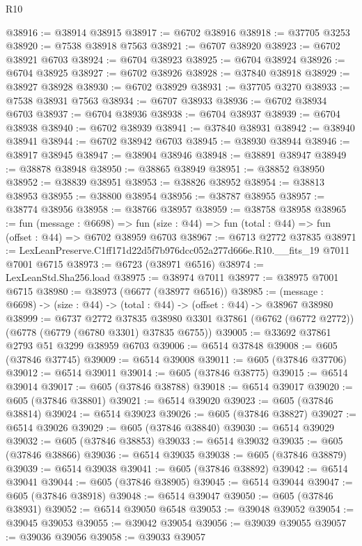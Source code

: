 \begin{lexlean}{R10}
\begin{coremodule}
@38916 := @38914 @38915
@38917 := @6702 @38916
@38918 := @37705 @3253
@38920 := @7538 @38918 @7563
@38921 := @6707 @38920
@38923 := @6702 @38921 @6703
@38924 := @6704 @38923
@38925 := @6704 @38924
@38926 := @6704 @38925
@38927 := @6702 @38926
@38928 := @37840 @38918
@38929 := @38927 @38928
@38930 := @6702 @38929
@38931 := @37705 @3270
@38933 := @7538 @38931 @7563
@38934 := @6707 @38933
@38936 := @6702 @38934 @6703
@38937 := @6704 @38936
@38938 := @6704 @38937
@38939 := @6704 @38938
@38940 := @6702 @38939
@38941 := @37840 @38931
@38942 := @38940 @38941
@38944 := @6702 @38942 @6703
@38945 := @38930 @38944
@38946 := @38917 @38945
@38947 := @38904 @38946
@38948 := @38891 @38947
@38949 := @38878 @38948
@38950 := @38865 @38949
@38951 := @38852 @38950
@38952 := @38839 @38951
@38953 := @38826 @38952
@38954 := @38813 @38953
@38955 := @38800 @38954
@38956 := @38787 @38955
@38957 := @38774 @38956
@38958 := @38766 @38957
@38959 := @38758 @38958
@38965 := fun (message : @6698) =>
  fun (size : @44) => fun (total : @44) => fun (offset : @44) => @6702 @38959 @6703
@38967 := @6713 @2772 @37835
@38971 := LexLeanPreserve.C1ff171d22d5f7b976dcc052a277d666e.R10.__fits_19 @7011 @7001 @6715
@38973 := @6723 (@38971 @6516)
@38974 := LexLeanStd.Sha256.load
@38975 := @38974 @7011
@38977 := @38975 @7001 @6715
@38980 := @38973 (@6677 (@38977 @6516))
@38985 := (message : @6698) -> (size : @44) -> (total : @44) -> (offset : @44) -> @38967 @38980
@38999 := @6737
    @2772
    @37835
    @38980
    @3301
    @37861
    (@6762 (@6772 @2772))
    (@6778 (@6779 (@6780 @3301) @37835 @6755))
@39005 := @33692 @37861 @2793 @51 @3299 @38959 @6703
@39006 := @6514 @37848
@39008 := @605 (@37846 @37745)
@39009 := @6514 @39008
@39011 := @605 (@37846 @37706)
@39012 := @6514 @39011
@39014 := @605 (@37846 @38775)
@39015 := @6514 @39014
@39017 := @605 (@37846 @38788)
@39018 := @6514 @39017
@39020 := @605 (@37846 @38801)
@39021 := @6514 @39020
@39023 := @605 (@37846 @38814)
@39024 := @6514 @39023
@39026 := @605 (@37846 @38827)
@39027 := @6514 @39026
@39029 := @605 (@37846 @38840)
@39030 := @6514 @39029
@39032 := @605 (@37846 @38853)
@39033 := @6514 @39032
@39035 := @605 (@37846 @38866)
@39036 := @6514 @39035
@39038 := @605 (@37846 @38879)
@39039 := @6514 @39038
@39041 := @605 (@37846 @38892)
@39042 := @6514 @39041
@39044 := @605 (@37846 @38905)
@39045 := @6514 @39044
@39047 := @605 (@37846 @38918)
@39048 := @6514 @39047
@39050 := @605 (@37846 @38931)
@39052 := @6514 @39050 @6548
@39053 := @39048 @39052
@39054 := @39045 @39053
@39055 := @39042 @39054
@39056 := @39039 @39055
@39057 := @39036 @39056
@39058 := @39033 @39057

\end{coremodule}
\end{lexlean}
